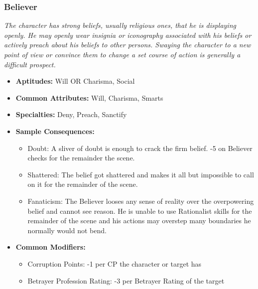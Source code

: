 \subsubsection{Believer}\label{Believer}
\textit{The character has strong beliefs, usually religious ones, that he is displaying openly.
He may openly wear insignia or iconography associated with his beliefs or actively preach about his beliefs to other persons.
Swaying the character to a new point of view or convince them to change a set course of action is generally a difficult prospect.}
\begin{itemize}
	\item \textbf{Aptitudes:} Will OR Charisma, Social
	\item \textbf{Common Attributes:} Will, Charisma, Smarts
	\item \textbf{Specialties:} Deny, Preach, Sanctify
	\item \textbf{Sample Consequences:} 
	\begin{itemize}
		\item Doubt: A sliver of doubt is enough to crack the firm belief. -5 on Believer checks for the remainder the scene.
		\item Shattered: The belief got shattered and makes it all but impossible to call on it for the remainder of the scene.
		\item Fanaticism: The Believer looses any sense of reality over the overpowering belief and cannot see reason. He is unable to use Rationalist skills for the remainder of the scene and his actions may overstep many boundaries he normally would not bend.
	\end{itemize}
	\item \textbf{Common Modifiers:}
	\begin{itemize}
		\item Corruption Points: -1 per CP the character or target has
		\item Betrayer Profession Rating: -3 per Betrayer Rating of the target
	\end{itemize}
\end{itemize}


